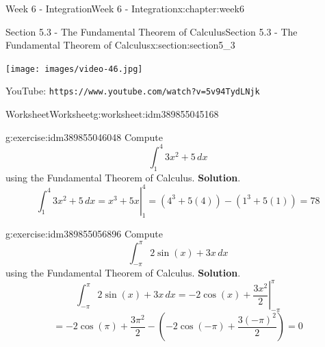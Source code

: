 \documentclass[oneside,10pt,]{book}
\newcommand{\blocktitlefont}{\relax}
\newcommand{\mono}[1]{\texttt{#1}}
\numberwithin{equation}{section}
\newlength{\qrsize}
\newlength{\previewwidth}
\begin{document}
\begin{chapterptx}{Week 6 - Integration}{}{Week 6 - Integration}{}{}{x:chapter:week6}
\begin{sectionptx}{Section 5.3 - The Fundamental Theorem of Calculus}{}{Section 5.3 - The Fundamental Theorem of Calculus}{}{}{x:section:section5_3}
\addtolength{\previewwidth}{-\qrsize}
\begin{tcbraster}[raster columns=2, raster column skip=1pt, raster halign=center, raster force size=false, raster left skip=0pt, raster right skip=0pt]%
\begin{tcolorbox}[previewstyle, width=\previewwidth]%
\texttt{[image: images/video-46.jpg]}%
\end{tcolorbox}%
\begin{tcolorbox}[qrstyle]%
{\hypersetup{urlcolor=black}}%
\end{tcolorbox}%
\begin{tcolorbox}[captionstyle]%
\small YouTube: \mono{https://www.youtube.com/watch?v=5v94TydLNjk}\end{tcolorbox}%
\end{tcbraster}%
%
%
\typeout{************************************************}
\typeout{************************************************}
%
\begin{worksheet-subsection}{Worksheet}{}{Worksheet}{}{}{g:worksheet:idm389855045168}
\begin{divisionexercise}{1}{}{}{g:exercise:idm389855046048}%
Compute%
\begin{equation*}
\int_1^4 3x^2+5 \, dx 
\end{equation*}
using the Fundamental Theorem of Calculus.%
\textbf{\blocktitlefont Solution}.\hypertarget{g:solution:idm389855051472}{}\quad{}%
\begin{equation*}
\left. \int_1^4 3x^2+5 \, dx = x^3+5x \right\vert_1^4 = (4^3+5(4))-(1^3+5(1))=78
\end{equation*}
\end{divisionexercise}%
\begin{divisionexercise}{2}{}{}{g:exercise:idm389855056896}%
Compute%
\begin{equation*}
\int_{-\pi}^{\pi} 2\sin(x)+3x \, dx 
\end{equation*}
using the Fundamental Theorem of Calculus.%
\textbf{\blocktitlefont Solution}.\hypertarget{g:solution:idm389855061552}{}\quad{}%
\begin{equation*}
\left. \int_{-\pi}^{\pi} 2\sin(x)+3x \, dx = -2\cos(x)+\frac{3x^2}{2} \right\vert_{-\pi}^{\pi} 
\end{equation*}
%
\begin{equation*}
= -2\cos(\pi)+\frac{3\pi^2}{2}-(-2\cos(-\pi)+\frac{3(-\pi)^2}{2}) = 0 

\end{equation*}
\end{divisionexercise}
\end{worksheet-subsection}
\end{sectionptx}
\end{chapterptx}
\end{document}

